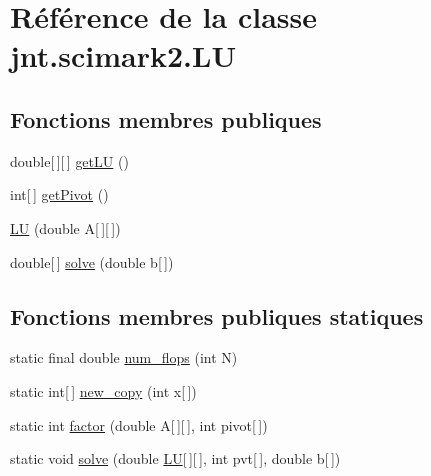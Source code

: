 \hypertarget{classjnt_1_1scimark2_1_1LU}{\section{Référence de la classe jnt.\-scimark2.\-L\-U}
\label{classjnt_1_1scimark2_1_1LU}
}
\subsection*{Fonctions membres publiques}
\begin{DoxyCompactItemize}
\item 
double\mbox{[}$\,$\mbox{]}\mbox{[}$\,$\mbox{]} \hyperlink{classjnt_1_1scimark2_1_1LU_a4c4ef8777647486f94a856255a2d24e3}{get\-L\-U} ()
\item 
int\mbox{[}$\,$\mbox{]} \hyperlink{classjnt_1_1scimark2_1_1LU_ac8ef7f807daefd75ab18c82b5ffcb6a4}{get\-Pivot} ()
\item 
\hyperlink{classjnt_1_1scimark2_1_1LU_a42f19d8a69ea1e76968b89857959ed64}{L\-U} (double A\mbox{[}$\,$\mbox{]}\mbox{[}$\,$\mbox{]})
\item 
double\mbox{[}$\,$\mbox{]} \hyperlink{classjnt_1_1scimark2_1_1LU_a52a0f291aa33a57e17ecbe132e6b0b8b}{solve} (double b\mbox{[}$\,$\mbox{]})
\end{DoxyCompactItemize}
\subsection*{Fonctions membres publiques statiques}
\begin{DoxyCompactItemize}
\item 
static final double \hyperlink{classjnt_1_1scimark2_1_1LU_afedd2a92dd10d4ab25f4c767ea072609}{num\-\_\-flops} (int N)
\item 
static int\mbox{[}$\,$\mbox{]} \hyperlink{classjnt_1_1scimark2_1_1LU_a1b774a1a2466d1c946d8cc3cb85ab340}{new\-\_\-copy} (int x\mbox{[}$\,$\mbox{]})
\item 
static int \hyperlink{classjnt_1_1scimark2_1_1LU_a36f7daaf1c35f9baa592d647bfb575bf}{factor} (double A\mbox{[}$\,$\mbox{]}\mbox{[}$\,$\mbox{]}, int pivot\mbox{[}$\,$\mbox{]})
\item 
static void \hyperlink{classjnt_1_1scimark2_1_1LU_a3566c9f4ac80669df58613cf1f620af7}{solve} (double \hyperlink{classjnt_1_1scimark2_1_1LU}{L\-U}\mbox{[}$\,$\mbox{]}\mbox{[}$\,$\mbox{]}, int pvt\mbox{[}$\,$\mbox{]}, double b\mbox{[}$\,$\mbox{]})
\end{DoxyCompactItemize}
